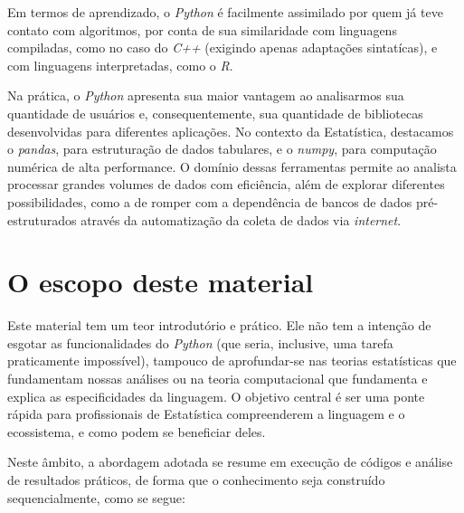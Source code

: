 \documentclass[
  brazilian,
  letterpaper,
  DIV=11,
  numbers=noendperiod]{scrreprt}
\begin{document}
Em termos de aprendizado, o \emph{Python} é facilmente assimilado por
quem já teve contato com algoritmos, por conta de sua similaridade com
linguagens compiladas, como no caso do \emph{C++} (exigindo apenas
adaptações sintatícas), e com linguagens interpretadas, como o \emph{R}.

Na prática, o \emph{Python} apresenta sua maior vantagem ao analisarmos
sua quantidade de usuários e, consequentemente, sua quantidade de
bibliotecas desenvolvidas para diferentes aplicações. No contexto da
Estatística, destacamos o \emph{pandas}, para estruturação de dados
tabulares, e o \emph{numpy}, para computação numérica de alta
performance. O domínio dessas ferramentas permite ao analista processar
grandes volumes de dados com eficiência, além de explorar diferentes
possibilidades, como a de romper com a dependência de bancos de dados
pré-estruturados através da automatização da coleta de dados via
\emph{internet}.

\section{O escopo deste material}\label{o-escopo-deste-material}

Este material tem um teor introdutório e prático. Ele não tem a intenção
de esgotar as funcionalidades do \emph{Python} (que seria, inclusive,
uma tarefa praticamente impossível), tampouco de aprofundar-se nas
teorias estatísticas que fundamentam nossas análises ou na teoria
computacional que fundamenta e explica as especificidades da linguagem.
O objetivo central é ser uma ponte rápida para profissionais de
Estatística compreenderem a linguagem e o ecossistema, e como podem se
beneficiar deles.

Neste âmbito, a abordagem adotada se resume em execução de códigos e
análise de resultados práticos, de forma que o conhecimento seja
construído sequencialmente, como se segue:
\end{document}
